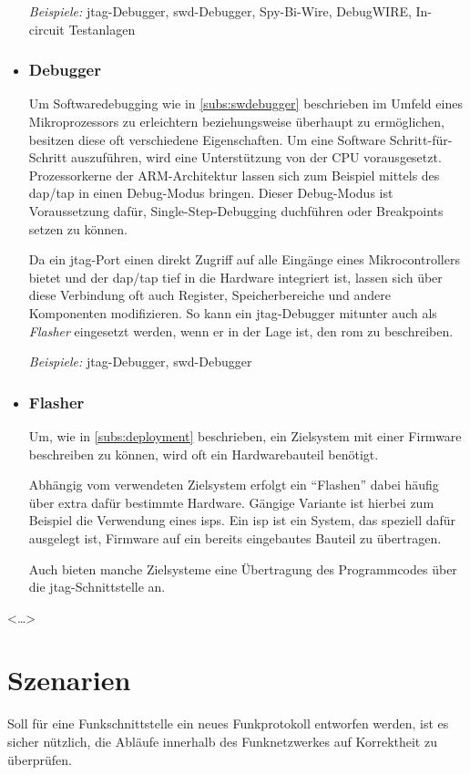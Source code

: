 \begin{itemize}
  \emph{Beispiele:} \gls{jtag}-Debugger, \gls{swd}-Debugger, Spy-Bi-Wire,
  DebugWIRE, In-circuit Testanlagen
  \item \subsubsection*{Debugger}\label{subs:hwdebugger}  Um
  Softwaredebugging wie in \autoref{subs:swdebugger} beschrieben im Umfeld eines
  Mikroprozessors zu erleichtern beziehungsweise überhaupt zu ermöglichen,
  besitzen diese oft verschiedene Eigenschaften.
  Um eine Software Schritt-für-Schritt auszuführen, wird eine Unterstützung von
  der CPU vorausgesetzt. Prozessorkerne der ARM-Architektur lassen sich zum
  Beispiel mittels des \gls{dap}/\gls{tap} in einen Debug-Modus bringen.
  Dieser Debug-Modus ist Voraussetzung dafür, Single-Step-Debugging duchführen
  oder Breakpoints setzen zu können.
  
  Da ein \gls{jtag}-Port einen direkt Zugriff auf alle Eingänge eines
  Mikrocontrollers bietet und der \gls{dap}/\gls{tap} tief in die Hardware
  integriert ist, lassen sich über diese Verbindung oft auch Register,
  Speicherbereiche und andere Komponenten modifizieren. So kann ein
  \gls{jtag}-Debugger mitunter auch als \emph{Flasher} eingesetzt werden, wenn
  er in der Lage ist, den \gls{rom} zu beschreiben.
  
  \emph{Beispiele:} \gls{jtag}-Debugger, \gls{swd}-Debugger
  \item \subsubsection*{Flasher} Um, wie in \autoref{subs:deployment}
  beschrieben, ein Zielsystem mit einer Firmware beschreiben zu können, wird
  oft ein Hardwarebauteil benötigt.
  
  Abhängig vom verwendeten Zielsystem erfolgt ein "`Flashen"' dabei häufig über
  extra dafür bestimmte Hardware. Gängige Variante ist hierbei zum Beispiel die
  Verwendung eines \glspl{isp}. Ein \gls{isp} ist ein System, das speziell
  dafür ausgelegt ist, Firmware auf ein bereits eingebautes Bauteil zu übertragen.
  
  Auch bieten manche Zielsysteme eine Übertragung des Programmcodes über die
  \gls{jtag}-Schnittstelle an.
\end{itemize}

<\ldots>
\section{Szenarien}
Soll für eine Funkschnittstelle ein neues Funkprotokoll entworfen
werden, ist es sicher nützlich, die Abläufe innerhalb des Funknetzwerkes auf
Korrektheit zu überprüfen.

